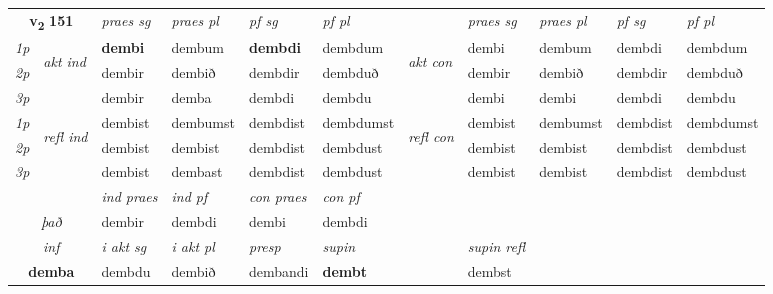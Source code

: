 \noindent
\begin{tabular}{lllllllllll} \toprule
\multicolumn{2}{c}{\textbf{v{\textsubscript{2}}} \Large{\textbf{151}}}  &  \textit{praes sg}  & \textit{praes pl}  &\textit{ pf sg} & \textit{pf pl} &  &  \textit{praes sg}  & \textit{praes pl}  & \textit{pf sg} & \textit{pf pl } \\*
	\cmidrule{3-6} \cmidrule{8-11}
 {\textit{1p}} & \multirow{3}{*}{\begin{turn}{90}\textit{akt ind}\end{turn}} & \textbf{dembi} & dembum & \textbf{dembdi} & dembdum & \multirow{3}{*}{\begin{turn}{90}\textit{akt con}\end{turn}} &dembi & dembum & dembdi & dembdum\\*
 {\textit{2p}} &  &  dembir  & dembið & dembdir & dembduð & & dembir & dembið & dembdir & dembduð \\*
{\textit{3p}} &  & dembir & demba & dembdi & dembdu & & dembi & dembi& dembdi & dembdu \\*
\cmidrule{3-6} \cmidrule{8-11}
 {\textit{1p}} & \multirow{3}{*}{\begin{turn}{90}\textit{refl ind}\end{turn}}  & dembist & dembumst & dembdist & dembdumst & \multirow{3}{*}{\begin{turn}{90}\textit{refl con}\end{turn}}  &dembist & dembumst & dembdist & dembdumst \\*
 {\textit{2p}} &  & dembist & dembist & dembdist & dembdust & &dembist & dembist & dembdist & dembdust \\*
 {\textit{3p}}  & & dembist & dembast & dembdist & dembdust & & dembist & dembist& dembdist & dembdust \\*
\cmidrule{3-6} \cmidrule{8-11}

   & &  \textit{ind praes} & \textit{ind pf} & \textit{con praes} & \textit{con pf} \\*
\multicolumn{2}{c}{ \textit{það} } & dembir & dembdi & dembi & dembdi \\*

\cmidrule{3-8}
   \multicolumn{2}{c}{\textit{inf}}  & \textit{i akt sg} & \textit{i akt pl}   & \textit{presp} & \textit{supin} && \textit{supin refl}  \\*
  \multicolumn{2}{c}{\textbf{demba}} & dembdu  & dembið   & dembandi &  \textbf{dembt} && dembst  \\*
\end{tabular}

